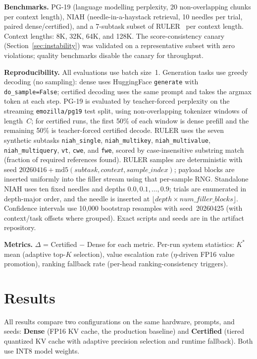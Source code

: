 \documentclass[10pt,twocolumn,a4paper]{article}
\theoremstyle{definition}
\theoremstyle{remark}
\begin{document}
\textbf{Benchmarks.}  PG-19 (language modelling perplexity, 20 non-overlapping chunks per context length), NIAH (needle-in-a-haystack retrieval, 10 needles per trial, paired dense/certified), and a 7-subtask subset of RULER~\cite{ruler} per context length.  Context lengths: 8K, 32K, 64K, and 128K.  The score-consistency canary (Section~\ref{sec:instability}) was validated on a representative subset with zero violations; quality benchmarks disable the canary for throughput.

\textbf{Reproducibility.}  All evaluations use batch size~1.  Generation tasks use greedy decoding (no sampling): dense uses HuggingFace \texttt{generate} with \texttt{do\_sample=False}; certified decoding uses the same prompt and takes the argmax token at each step.  PG-19 is evaluated by teacher-forced perplexity on the streaming \texttt{emozilla/pg19} test split, using non-overlapping tokenizer windows of length~$C$; for certified runs, the first 50\% of each window is dense prefill and the remaining 50\% is teacher-forced certified decode.  RULER uses the seven synthetic subtasks \texttt{niah\_single}, \texttt{niah\_multikey}, \texttt{niah\_multivalue}, \texttt{niah\_multiquery}, \texttt{vt}, \texttt{cwe}, and \texttt{fwe}, scored by case-insensitive substring match (fraction of required references found).  RULER samples are deterministic with seed $20260416 + \mathrm{md5}(\mathit{subtask}, \mathit{context}, \mathit{sample\_index})$; payload blocks are inserted uniformly into the filler stream using that per-sample RNG\@.  Standalone NIAH uses ten fixed needles and depths $0.0, 0.1, \ldots, 0.9$; trials are enumerated in depth-major order, and the needle is inserted at $\lfloor\mathit{depth} \times \mathit{num\_filler\_blocks}\rfloor$.  Confidence intervals use 10{,}000 bootstrap resamples with seed~20260425 (with context/task offsets where grouped).  Exact scripts and seeds are in the artifact repository.

\textbf{Metrics.}  $\Delta$ = Certified $-$ Dense for each metric.  Per-run system statistics: $K^*$ mean (adaptive top-$K$ selection), value escalation rate ($\eta$-driven FP16 value promotion), ranking fallback rate (per-head ranking-consistency triggers).


\section{Results}
\label{sec:results}

All results compare two configurations on the same hardware, prompts, and seeds: \textbf{Dense} (FP16 KV cache, the production baseline) and \textbf{Certified} (tiered quantized KV cache with adaptive precision selection and runtime fallback).  Both use INT8 model weights.
\end{document}
